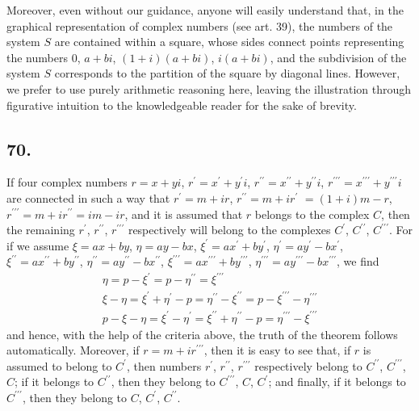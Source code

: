 \documentclass[twoside,12pt]{memoir}
\begin{document}
Moreover, even without our guidance, anyone will easily understand that, in the graphical representation of complex numbers (see art. 39), the numbers of the system \(S\) are contained within a square, whose sides connect points representing the numbers \(0\), \(a+b i\), \((1+i)(a+b i)\), \(i(a+b i)\), and the subdivision of the system \(S\) corresponds to the partition of the square by diagonal lines. However, we prefer to use purely arithmetic reasoning here, leaving the illustration through figurative intuition to the knowledgeable reader for the sake of brevity.
%

\subsection*{70.}

If four complex numbers \(r=x+yi\), \(r^{\prime}=x^{\prime}+y^{\prime}i\), \(r^{\prime \prime}=x^{\prime \prime}+y^{\prime \prime}i\), \(r^{\prime \prime \prime}=x^{\prime \prime \prime}+y^{\prime \prime \prime}i\) are connected in such a way that \(r^{\prime}=m+ir\), \(r^{\prime \prime}=m+ir^{\prime}\) \(=(1+i)m-r\), \(r^{\prime \prime \prime}=m+ir^{\prime \prime}=im-ir\), and it is assumed that \(r\) belongs to the complex \(C\), then the remaining \(r^{\prime}\), \(r^{\prime \prime}\), \(r^{\prime \prime \prime}\) respectively will belong to the complexes \(C^{\prime}\), \(C^{\prime \prime}\), \(C^{\prime
\prime \prime}\). For if we assume \(\xi=ax+by\), \(\eta=ay-bx\), \(\xi^{\prime}=ax^{\prime}+by^{\prime}\), \(\eta^{\prime}=ay^{\prime}-bx^{\prime}\), \(\xi^{\prime \prime}=ax^{\prime \prime}+by^{\prime \prime}\), \(\eta^{\prime \prime}=ay^{\prime \prime}-bx^{\prime \prime}\), \(\xi^{\prime \prime \prime}=ax^{\prime \prime \prime}+by^{\prime \prime \prime}\), \(\eta^{\prime \prime \prime}=ay^{\prime \prime \prime}-bx^{\prime \prime \prime}\), we find
\[\begin{gathered}
\eta=p-\xi^{\prime}=p-\eta^{\prime \prime}=\xi^{\prime \prime \prime} \\
\xi-\eta=\xi^{\prime}+\eta^{\prime}-p=\eta^{\prime \prime}-\xi^{\prime \prime}=p-\xi^{\prime \prime \prime}-\eta^{\prime \prime \prime} \\
p-\xi-\eta=\xi^{\prime}-\eta^{\prime}=\xi^{\prime \prime}+\eta^{\prime \prime}-p=\eta^{\prime \prime \prime}-\xi^{\prime \prime \prime}
\end{gathered}\]
and hence, with the help of the criteria above, the truth of the theorem follows automatically.  Moreover, if \(r=m+ir^{\prime \prime \prime}\), then it is easy to see that, if \(r\) is assumed to belong to \(C^{\prime}\), then numbers \(r^{\prime}\), \(r^{\prime \prime}\), \(r^{\prime \prime \prime}\) respectively belong to \(C^{\prime \prime}\), \(C^{\prime \prime \prime}\), \(C\); if it belongs to \(C^{\prime \prime}\), then they belong to \(C^{\prime \prime \prime}\), \(C\), \(C^{\prime}\); and finally, if it belongs to \(C^{\prime \prime \prime}\), then they belong to \(C\), \(C^{\prime}\), \(C^{\prime \prime}\).
\end{document}
